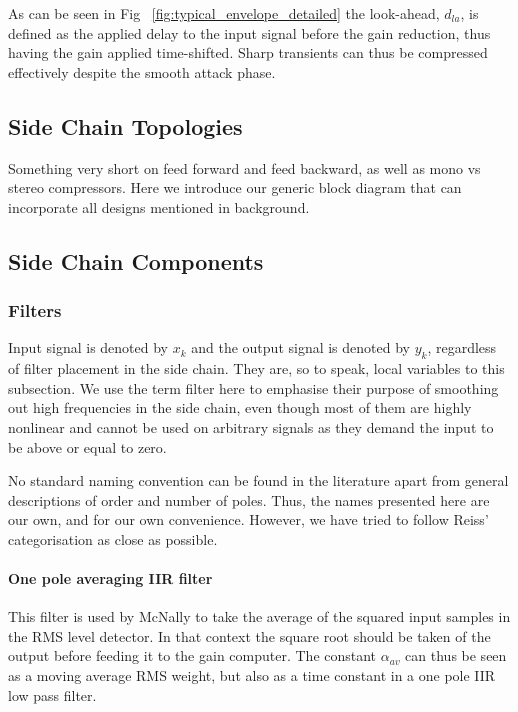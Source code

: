 \documentclass[../main2.tex]{subfiles}
\providecommand{\rootdir}{..}
\begin{document}
As can be seen in Fig ~\ref{fig:typical_envelope_detailed} the look-ahead, $d_{la}$, is defined as the applied delay to the input signal before the gain reduction, thus having the gain applied time-shifted. Sharp transients can thus be compressed effectively despite the smooth attack phase.

\subsection{Side Chain Topologies}
Something very short on feed forward and feed backward, as well as mono vs stereo compressors.
Here we introduce our generic block diagram that can incorporate all designs mentioned in background.





\subsection{Side Chain Components}

\subsubsection{Filters}
Input signal is denoted by $x_k$ and the output signal is denoted by $y_k$, regardless of filter placement in the side chain. They are, so to speak, local variables to this subsection. We use the term filter here to emphasise their purpose of smoothing out high frequencies in the side chain, even though most of them are highly nonlinear and cannot be used on arbitrary signals as they demand the input to be above or equal to zero.

No standard naming convention can be found in the literature apart from general descriptions of order and number of poles. Thus, the names presented here are our own, and for our own convenience. However, we have tried to follow Reiss' categorisation as close as possible.

\paragraph{One pole averaging IIR filter}
This filter is used by McNally to take the average of the squared input samples in the RMS level detector. In that context the square root should be taken of the output before feeding it to the gain computer. The constant $\alpha_{av}$ can thus be seen as a moving average RMS weight, but also as a time constant in a one pole IIR low pass filter.
\end{document}
